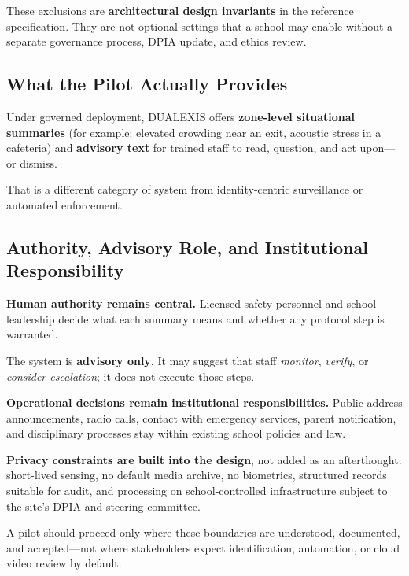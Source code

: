 These exclusions are \textbf{architectural design invariants} in the reference specification.
They are not optional settings that a school may enable without a separate governance process,
DPIA update, and ethics review.

\subsection{What the Pilot Actually Provides}

Under governed deployment, DUALEXIS offers \textbf{zone-level situational summaries}
(for example: elevated crowding near an exit, acoustic stress in a cafeteria) and
\textbf{advisory text} for trained staff to read, question, and act upon---or dismiss.

That is a different category of system from identity-centric surveillance or automated
enforcement.

\subsection{Authority, Advisory Role, and Institutional Responsibility}

\textbf{Human authority remains central.}
Licensed safety personnel and school leadership decide what each summary means and whether
any protocol step is warranted.

The system is \textbf{advisory only}.
It may suggest that staff \emph{monitor}, \emph{verify}, or \emph{consider escalation};
it does not execute those steps.

\textbf{Operational decisions remain institutional responsibilities.}
Public-address announcements, radio calls, contact with emergency services, parent
notification, and disciplinary processes stay within existing school policies and law.

\textbf{Privacy constraints are built into the design}, not added as an afterthought:
short-lived sensing, no default media archive, no biometrics, structured records suitable
for audit, and processing on school-controlled infrastructure subject to the site's DPIA
and steering committee.

A pilot should proceed only where these boundaries are understood, documented, and
accepted---not where stakeholders expect identification, automation, or cloud video review
by default.
